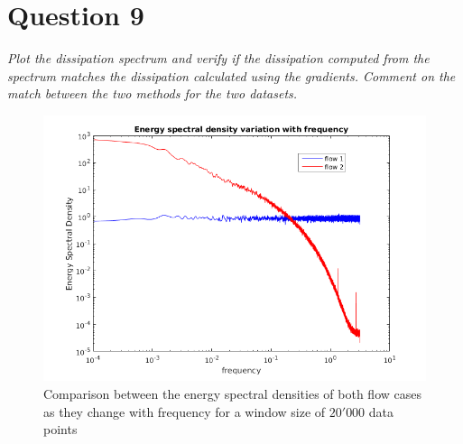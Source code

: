 \section*{Question 9}
\textit{Plot the dissipation spectrum and verify if the dissipation computed from the spectrum matches the dissipation calculated using the gradients. Comment on the match between the two methods for the two datasets.}

\begin{figure}[!ht]
\centering
\includegraphics[scale=0.5]{./TEXT/esd.png}
\caption{Comparison between the energy spectral densities of both flow cases as they change with frequency for a window size of $20'000$ data points}
\label{esd}
\end{figure}
